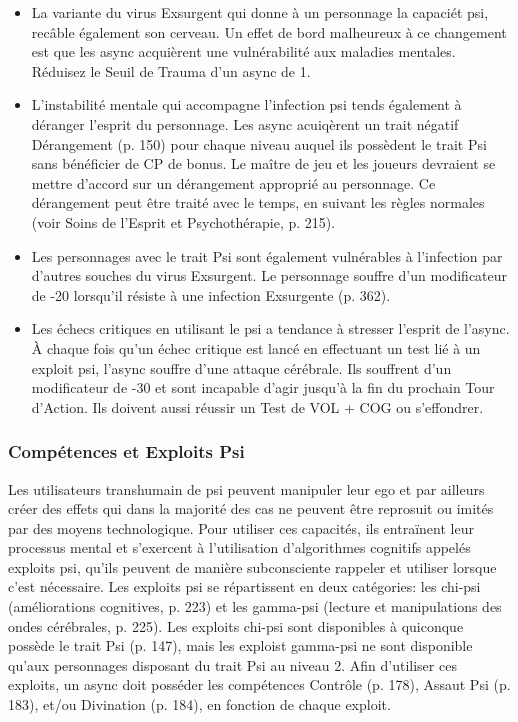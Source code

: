 \begin{itemize} \item La variante du virus Exsurgent qui donne à un personnage la capaciét psi, recâble également son cerveau. Un effet de bord malheureux à ce changement est que les async acquièrent une vulnérabilité aux maladies mentales. Réduisez le Seuil de Trauma d'un async de 1. \item L'instabilité mentale qui accompagne l'infection psi tends également à déranger l'esprit du personnage. Les async acuiqèrent un trait négatif Dérangement (p. 150) pour chaque niveau auquel ils possèdent le trait Psi sans bénéficier de CP de bonus. Le maître de jeu et les joueurs devraient se mettre d'accord sur un dérangement approprié au personnage. Ce dérangement peut être traité avec le temps, en suivant les règles normales (voir Soins de l'Esprit et Psychothérapie, p. 215). \item Les personnages avec le trait Psi sont également vulnérables à l'infection par d'autres souches du virus Exsurgent. Le personnage souffre d'un modificateur de -20 lorsqu'il résiste à une infection Exsurgente (p. 362). \item Les échecs critiques en utilisant le psi a tendance à stresser l'esprit de l'async. À chaque fois qu'un échec critique est lancé en effectuant un test lié à un exploit psi, l'async souffre d'une attaque cérébrale. Ils souffrent d'un modificateur de -30 et sont incapable d'agir jusqu'à la fin du prochain Tour d'Action. Ils doivent aussi réussir un Test de VOL + COG ou s'effondrer. \end{itemize} 

\subsubsection{Compétences et Exploits Psi} 

Les utilisateurs transhumain de psi peuvent manipuler leur ego et par ailleurs créer des effets qui dans la majorité des cas ne peuvent être reprosuit ou imités par des moyens technologique. Pour utiliser ces capacités, ils entraïnent leur processus mental et s'exercent à l'utilisation d'algorithmes cognitifs appelés exploits psi, qu'ils peuvent de manière subconsciente rappeler et utiliser lorsque c'est nécessaire. Les exploits psi se répartissent en deux catégories: les chi-psi (améliorations cognitives, p. 223) et les gamma-psi (lecture et manipulations des ondes cérébrales, p. 225). Les exploits chi-psi sont disponibles à quiconque possède le trait Psi (p. 147), mais les exploist gamma-psi ne sont disponible qu'aux personnages disposant du trait Psi au niveau 2. Afin d'utiliser ces exploits, un async doit posséder les compétences Contrôle (p. 178), Assaut Psi  (p. 183), et/ou Divination (p. 184), en fonction de chaque exploit. 

